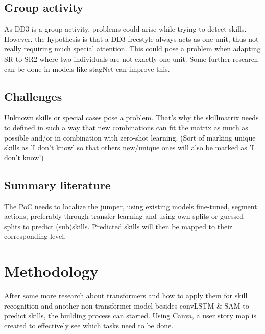 \subsection{Group activity}

As DD3 is a group activity, problems could arise while trying to detect skills. However, the hypothesis is that a DD3 freestyle always acts as one unit, thus not really requiring much special attention. This could pose a problem when adapting SR to SR2 where two individuals are not exactly one unit. Some further research can be done in models like stagNet \autocite{Qi_2020} can improve this.

\subsection{Challenges}
\label{subsec:challenges}

Unknown skills or special cases pose a problem. That's why the skillmatrix needs to defined in such a way that new combinations can fit the matrix as much as possible and/or in combination with zero-shot learning. (Sort of marking unique skills as 'I don't know' so that others new/unique ones will also be marked as 'I don't know')


\subsection{Summary literature}
\label{subsec:summary literature}

The PoC needs to localize the jumper, using existing models fine-tuned, segment actions, preferably through transfer-learning and using own splits or guessed splits to predict (sub)skills.
Predicted skills will then be mapped to their corresponding level.



\section{Methodology}%
\label{sec:methodoly}

After some more research about transformers and how to apply them for skill recognition and another non-transformer model besides convLSTM \& SAM to predict skills, the building process can started.
Using Canva, a \href{https://www.canva.com/design/DAGVz44QCgc/\_Mr9BrOqwwdy9cf-ieYFVg/edit?utm\_content=DAGVz44QCgc\&utm\_campaign=designshare\&utm\_medium=link2\&utm\_source=sharebutton}{user story map} is created to effectively see which tasks need to be done.


